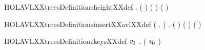 \newcommand{\HOLAVLXXtreesDefinitionsdeleteXXavlXXdef}{\UseVerbatim{HOLAVLXXtreesDefinitionsdeleteXXavlXXdef}}
\begin{SaveVerbatim}{HOLAVLXXtreesDefinitionsheightXXdef}
\HOLTokenTurnstile{}   \HOLSymConst{=}  \HOLSymConst{\HOLTokenConj{}}
   \HOLSymConst{\HOLTokenForall{}}    .
      (     ) \HOLSymConst{=}  ( ) ( ) \HOLSymConst{\ensuremath{+}} 
\end{SaveVerbatim}
\newcommand{\HOLAVLXXtreesDefinitionsheightXXdef}{\UseVerbatim{HOLAVLXXtreesDefinitionsheightXXdef}}
\begin{SaveVerbatim}{HOLAVLXXtreesDefinitionsinsertXXavlXXdef}
\HOLTokenTurnstile{} (\HOLSymConst{\HOLTokenForall{}} .     \HOLSymConst{=}   ) \HOLSymConst{\HOLTokenConj{}}
   \HOLSymConst{\HOLTokenForall{}}      .
        (     ) \HOLSymConst{=}
       \HOLSymConst{=}        
        \HOLSymConst{\HOLTokenLt{}}      (   ) 
          (   )
\end{SaveVerbatim}
\newcommand{\HOLAVLXXtreesDefinitionsinsertXXavlXXdef}{\UseVerbatim{HOLAVLXXtreesDefinitionsinsertXXavlXXdef}}
\begin{SaveVerbatim}{HOLAVLXXtreesDefinitionskeysXXdef}
\HOLTokenTurnstile{}   \HOLSymConst{=} \HOLTokenLeftbrace{}\HOLTokenRightbrace{} \HOLSymConst{\HOLTokenConj{}}
   \HOLSymConst{\HOLTokenForall{}}\ensuremath{\HOLBoundVar{v}\sb{\mathrm{0}}}    .  ( \ensuremath{\HOLBoundVar{v}\sb{\mathrm{0}}}    ) \HOLSymConst{=} \HOLTokenLeftbrace{}\HOLTokenRightbrace{} \HOLConst{\HOLTokenUnion{}}   \HOLConst{\HOLTokenUnion{}}  
\end{SaveVerbatim}
